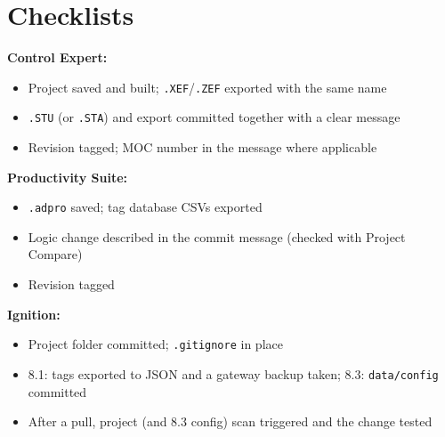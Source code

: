 \section{Checklists}
\textbf{Control Expert:}
\begin{itemize}[itemsep=1pt, label=$\square$]
  \item Project saved and built; \texttt{.XEF}/\texttt{.ZEF} exported with the same name
  \item \texttt{.STU} (or \texttt{.STA}) and export committed together with a clear message
  \item Revision tagged; MOC number in the message where applicable
\end{itemize}
\textbf{Productivity Suite:}
\begin{itemize}[itemsep=1pt, label=$\square$]
  \item \texttt{.adpro} saved; tag database CSVs exported
  \item Logic change described in the commit message (checked with Project Compare)
  \item Revision tagged
\end{itemize}
\textbf{Ignition:}
\begin{itemize}[itemsep=1pt, label=$\square$]
  \item Project folder committed; \texttt{.gitignore} in place
  \item 8.1: tags exported to JSON and a gateway backup taken; 8.3: \texttt{data/config} committed
  \item After a pull, project (and 8.3 config) scan triggered and the change tested
\end{itemize}
